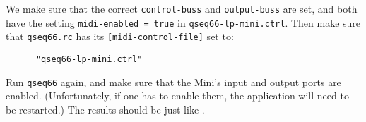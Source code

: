    We make sure that the correct \texttt{control-buss} and
   \texttt{output-buss} are set, and both have the setting
   \texttt{midi-enabled = true} in \texttt{qseq66-lp-mini.ctrl}.
   Then make sure that \texttt{qseq66.rc} has its
   \texttt{[midi-control-file]} set to:

   \begin{verbatim}
      "qseq66-lp-mini.ctrl"
   \end{verbatim}

   Run \texttt{qseq66} again, and make sure that the Mini's input and output
   ports are enabled. (Unfortunately, if one has to enable them, the
   application will need to be restarted.)
   The results should be just like
   .

